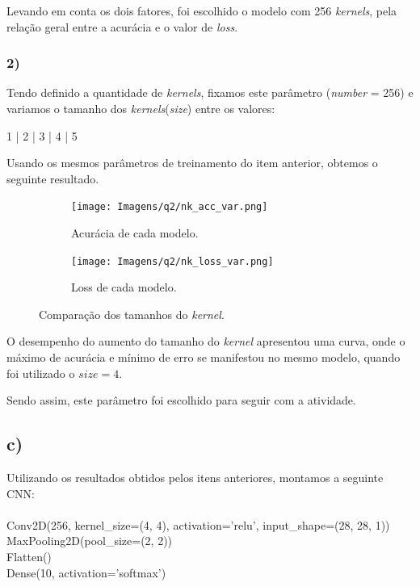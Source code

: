 \documentclass[12pt]{article}
\begin{document}
Levando em conta os dois fatores, foi escolhido o modelo com 256 \textit{kernels}, pela relação geral entre a acurácia e o valor de \textit{loss}.

\subsubsection*{2)}

Tendo definido a quantidade de \textit{kernels}, fixamos este parâmetro (\textit{number} = 256) e variamos o tamanho dos \textit{kernels}(\textit{size}) entre os valores:

\begin{center}
	1 | 2 | 3 | 4 | 5
\end{center}

Usando os mesmos parâmetros de treinamento do item anterior, obtemos o seguinte resultado.

\begin{figure}[H]
	\centering
	\begin{subfigure}{0.65\linewidth}
		\centering
		\texttt{[image: Imagens/q2/nk\_acc\_var.png]}
		\caption{Acurácia de cada modelo.}
		\label{fig:nk_acc_var}
	\end{subfigure}
	
	\begin{subfigure}{0.65\linewidth}
		\centering
		\texttt{[image: Imagens/q2/nk\_loss\_var.png]}
		\caption{Loss de cada modelo.}
		\label{fig:nk_loss_var}
	\end{subfigure}
	\caption{Comparação dos tamanhos do \textit{kernel}.}
	\label{fig:comp_nk}
\end{figure}

O desempenho do aumento do tamanho do \textit{kernel} apresentou uma curva, onde o máximo de acurácia e mínimo de erro se manifestou no mesmo modelo, quando foi utilizado o $size = 4$. 

Sendo assim, este parâmetro foi escolhido para seguir com a atividade.

\subsection*{c)}

Utilizando os resultados obtidos pelos itens anteriores, montamos a seguinte CNN:\\
\\
Conv2D(\color{red}256\color{black}, kernel\_size=(\color{red}4\color{black}, \color{red}4\color{black}), activation='relu', input\_shape=(28, 28, 1))\\
MaxPooling2D(pool\_size=(2, 2))\\
Flatten()\\
Dense(10, activation='softmax') \\
\end{document}
